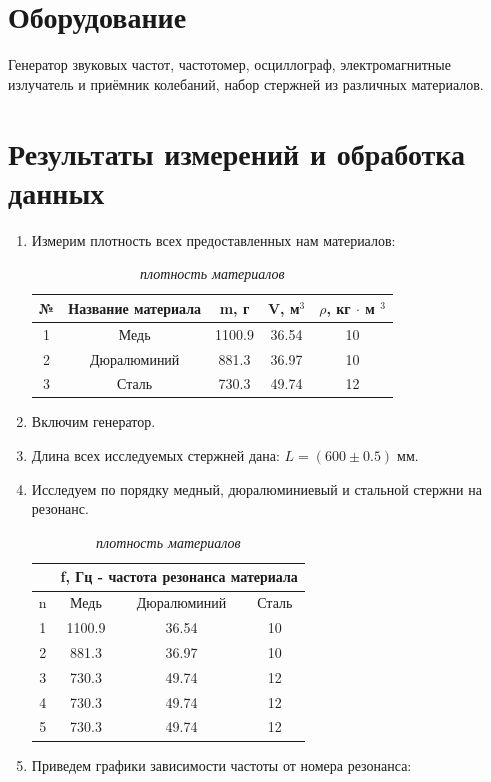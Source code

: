 \documentclass[a4paper, 10pt, twocolumn]{article}
\begin{document}
\section{Оборудование}
Генератор звуковых частот, частотомер, осциллограф,
электромагнитные излучатель и приёмник колебаний, набор стержней из различных материалов.

\section{Результаты измерений и обработка данных}
\begin{enumerate}
    \item Измерим плотность всех предоставленных нам материалов:
    \begin{table}[h]
        \centering
        \caption{\textit{плотность материалов}}
        \label{tab:my_label}
        \begin{tabular}{|c|c|c|c|c|}
        \hline
        № & Название материала & m, г & V, м$^{3}$ & $\rho$, кг $\cdot$ м $^3$ \\ \hline
        1 & Медь               & 1100.9 & 36.54 & 10 \\ \hline
        2 & Дюралюминий        & 881.3  & 36.97 & 10 \\ \hline
        3 & Сталь              & 730.3  & 49.74 & 12 \\ \hline
        \end{tabular}
    \end{table}
    \item Включим генератор.
    \item Длина всех исследуемых стержней дана: $L = (600\pm0.5)\;\text{мм}$.
    \item Исследуем по порядку медный, дюралюминиевый и стальной стержни на
    резонанс.
    \begin{table}[h]
        \centering
        \caption{\textit{плотность материалов}}
        \label{tab:my_label}
        \begin{tabular}{|c|c|c|c|} \hline
        & \multicolumn{3}{c|}{f, Гц - частота резонанса материала} \\ \hline
        n & Медь & Дюралюминий & Сталь \\ \hline
        1 & 1100.9 & 36.54 & 10 \\ \hline
        2 & 881.3  & 36.97 & 10 \\ \hline
        3 & 730.3  & 49.74 & 12 \\ \hline
        4 & 730.3  & 49.74 & 12 \\ \hline
        5 & 730.3  & 49.74 & 12 \\ \hline
        \end{tabular}
    \end{table}
    \item Приведем графики зависимости частоты от номера резонанса:


\end{enumerate}
\end{document}
